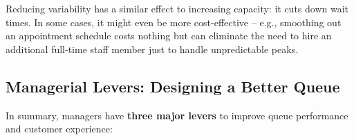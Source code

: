 \documentclass[
  letterpaper,
  DIV=11,
  numbers=noendperiod]{scrartcl}
\begin{document}
Reducing variability has a similar effect to increasing capacity: it
cuts down wait times. In some cases, it might even be more
cost-effective -- e.g., smoothing out an appointment schedule costs
nothing but can eliminate the need to hire an additional full-time staff
member just to handle unpredictable peaks.

\subsection{\texorpdfstring{\textbf{Managerial Levers: Designing a
Better
Queue}}{Managerial Levers: Designing a Better Queue}}\label{managerial-levers-designing-a-better-queue}

In summary, managers have \textbf{three major levers} to improve queue
performance and customer experience:
\end{document}
